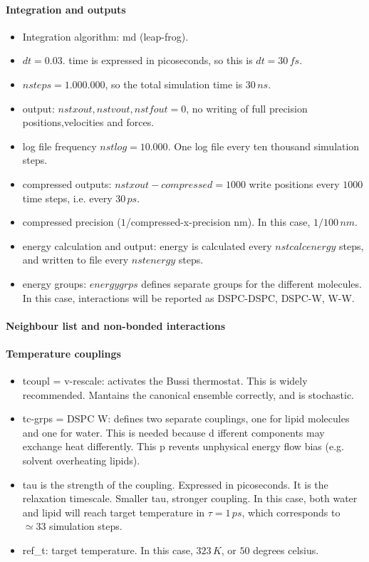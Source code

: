 \paragraph{Integration and outputs}
\begin{itemize}
    \item Integration algorithm: md (leap-frog).
    \item $dt=0.03$. time is expressed in picoseconds, so this is $dt=30\, fs$. 
    \item $nsteps=1.000.000$, so the total simulation time is $30\, ns$.
    \item output: $nstxout, nstvout, nstfout = 0$, no writing of full precision positions,velocities and forces.
    \item log file frequency $nstlog = 10.000$. One log file every ten thousand simulation steps. 
    \item compressed outputs: $nstxout-compressed = 1000$ write positions every $1000$ time steps, i.e. every $30 \,ps$.
    \item compressed precision ($1$/compressed-x-precision nm). In this case, $1/100\, nm$.
    \item energy calculation and output: energy is calculated every $nstcalcenergy$ steps, and written to file every $nstenergy$ steps.
    \item energy groups: $energygrps$ defines separate groups for the different molecules. In this case, interactions will be reported as DSPC-DSPC, DSPC-W, W-W.
\end{itemize}
\paragraph{Neighbour list and non-bonded interactions}


\paragraph{Temperature couplings}
\begin{itemize}
    \item tcoupl = v-rescale: activates the Bussi thermostat. This is widely recommended. Mantains the canonical ensemble correctly, and is stochastic.
    \item tc-grps = DSPC W: defines two separate couplings, one for lipid molecules and one for water. This is needed because d    ifferent components may exchange heat differently. This p    revents unphysical energy flow bias (e.g. solvent overheating lipids). 
    \item tau is the strength of the coupling. Expressed in picoseconds. It is the relaxation timescale. Smaller tau, stronger coupling. In this case, both water and
    lipid will reach target temperature in $\tau = 1\, ps$, which corresponds to $\simeq 33$ simulation steps. 
    \item ref\_t: target temperature. In this case, $323\, K$, or $50$ degrees celsius.
\end{itemize}

